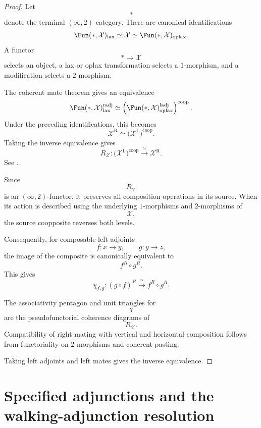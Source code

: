 \begin{proof}
Let
\[
    *
\]
denote the terminal $(\infty,2)$-category. There are canonical
identifications
\[
    \Fun(*,\mathcal X)_{\mathrm{lax}}
    \simeq
    \mathcal X
    \simeq
    \Fun(*,\mathcal X)_{\mathrm{oplax}}.
\]
A functor
\[
    *
    \longrightarrow
    \mathcal X
\]
selects an object, a lax or oplax transformation selects a
$1$-morphism, and a modification selects a $2$-morphism.

The coherent mate theorem gives an equivalence
\[
    \Fun(*,\mathcal X)_{\mathrm{lax}}^{\mathrm{radj}}
    \simeq
    \left(
        \Fun(*,\mathcal X)_{\mathrm{oplax}}^{\mathrm{ladj}}
    \right)^{\mathrm{coop}}.
\]
Under the preceding identifications, this becomes
\[
    \mathcal X^{\mathrm R}
    \simeq
    \bigl(
        \mathcal X^{\mathrm L}
    \bigr)^{\mathrm{coop}}.
\]
Taking the inverse equivalence gives
\[
    R_{\mathcal X}
    \colon
    \bigl(
        \mathcal X^{\mathrm L}
    \bigr)^{\mathrm{coop}}
    \xrightarrow{\;\simeq\;}
    \mathcal X^{\mathrm R}.
\]
See
\cite[Theorem~5.3.6]{AbellanGagnaHaugsengMates}.

Since
\[
    R_{\mathcal X}
\]
is an $(\infty,2)$-functor, it preserves all composition operations in
its source. When its action is described using the underlying
$1$-morphisms and $2$-morphisms of
\[
    \mathcal X,
\]
the source coopposite reverses both levels.

Consequently, for composable left adjoints
\[
    f
    \colon
    x
    \longrightarrow
    y,
    \qquad
    g
    \colon
    y
    \longrightarrow
    z,
\]
the image of the composite is canonically equivalent to
\[
    f^R\circ g^R.
\]
This gives
\[
    \chi_{f,g}
    \colon
    (g\circ f)^R
    \xrightarrow{\;\simeq\;}
    f^R\circ g^R.
\]

The associativity pentagon and unit triangles for
\[
    \chi
\]
are the pseudofunctorial coherence diagrams of
\[
    R_{\mathcal X}.
\]
Compatibility of right mating with vertical and horizontal composition
follows from functoriality on $2$-morphisms and coherent pasting.

Taking left adjoints and left mates gives the inverse equivalence.
\end{proof}

\section{Specified adjunctions and the walking-adjunction resolution}
\label{sec:specified-adjunctions}

